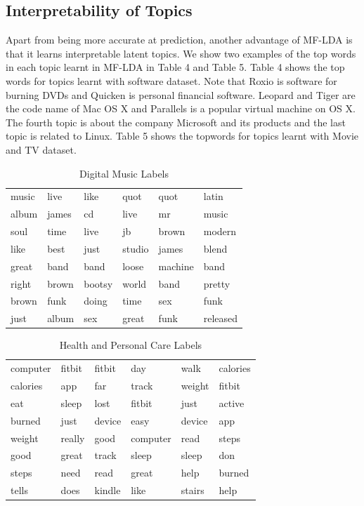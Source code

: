 \documentclass[10pt,conference]{IEEEtran}
\begin{document}
\subsection{Interpretability of Topics}
Apart from being more accurate at pred​iction, another advantage of MF-LDA is that it learns interpretable latent topics. We show two examples of the top words in each topic learnt in MF-LDA in Table 4 and Table 5. Table 4 shows the top words for topics learnt with software dataset. Note that Roxio is software for burning DVDs and Quicken is personal financial software. Leopard and Tiger are the code name of Mac OS X and Parallels is a popular virtual machine on OS X. The fourth topic is about the company Microsoft and its products and the last topic is related to Linux. Table 5 shows the topwords for topics learnt with Movie and TV dataset.

\begin{table}[h]
\centering
\caption{Digital Music Labels}
\label{Digital Music Labels}
\begin{tabular}{ llllll }
\midrule
music  & live  & like  & quot  & quot & latin \\
album  & james  & cd  & live  & mr & music \\
soul   & time  & live  & jb  & brown & modern \\ 
like  & best  & just  & studio  & james & blend \\ 
great    & band  & band  & loose  & machine & band \\ 
right  & brown & bootsy  & world & band & pretty \\ 
brown   & funk  & doing  &  time  &  sex & funk \\ 
just   & album  & sex & great &  funk & released \\ 
\bottomrule          
\end{tabular}
\end{table}


\begin{table}[h]
\centering
\caption{Health and Personal Care Labels}
\label{Health and Personal Care Labels}
\begin{tabular}{ llllll }
\midrule
computer & fitbit & fitbit & day & walk & calories \\
calories & app & far & track & weight & fitbit \\
eat & sleep & lost & fitbit & just & active \\
burned & just & device & easy & device & app \\
weight & really & good & computer & read & steps \\
good & great & track & sleep & sleep & don \\
steps & need & read & great & help & burned \\
tells & does & kindle & like & stairs & help \\
\bottomrule          
\end{tabular}
\end{table}
\end{document}
